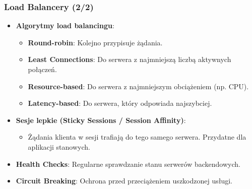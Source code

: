 \documentclass[aspectratio=169,xcolor=table]{beamer}
\begin{document}
\begin{frame}
  \frametitle{Load Balancery (2/2)}
  \begin{itemize}
    \item \textbf{Algorytmy load balancingu}:
        \begin{itemize}
            \item \textbf{Round-robin}: Kolejno przypisuje żądania.
            \item \textbf{Least Connections}: Do serwera z najmniejszą liczbą aktywnych połączeń.
            \item \textbf{Resource-based}: Do serwera z najmniejszym obciążeniem (np. CPU).
            \item \textbf{Latency-based}: Do serwera, który odpowiada najszybciej.
        \end{itemize}
    \item \textbf{Sesje lepkie (Sticky Sessions / Session Affinity)}:
        \begin{itemize}
            \item Żądania klienta w sesji trafiają do tego samego serwera. Przydatne dla aplikacji stanowych.
        \end{itemize}
    \item \textbf{Health Checks}: Regularne sprawdzanie stanu serwerów backendowych.
    \item \textbf{Circuit Breaking}: Ochrona przed przeciążeniem uszkodzonej usługi.
  \end{itemize}
\end{frame}
\end{document}
